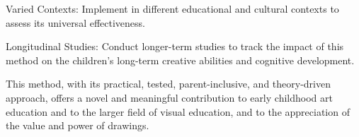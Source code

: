 \documentclass{article}
\begin{document}
Varied Contexts: Implement in different educational and cultural contexts to assess its universal effectiveness.

Longitudinal Studies: Conduct longer-term studies to track the impact of this method on the children’s long-term creative abilities and cognitive development.

This method, with its practical, tested, parent-inclusive, and theory-driven approach, offers a novel and meaningful contribution to early childhood art education and to the larger field of visual education, and to the appreciation of the value and power of drawings.








\end{document}
